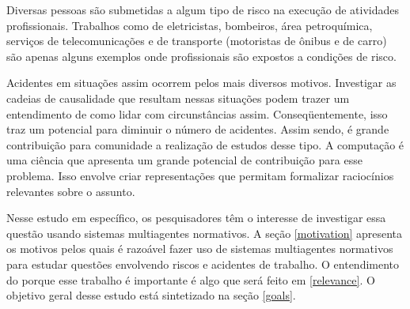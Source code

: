 Diversas pessoas são submetidas a algum tipo de risco na execução de atividades profissionais. Trabalhos como de eletricistas, bombeiros, área petroquímica, serviços de telecomunicações e de transporte (motoristas de ônibus e de carro) são apenas alguns exemplos onde profissionais são expostos a condições de risco.

Acidentes em situações assim ocorrem pelos mais diversos motivos. Investigar as cadeias de causalidade que resultam nessas situações podem trazer um entendimento de como lidar com circunstâncias assim. Conseqüentemente, isso traz um potencial para diminuir o número de acidentes. Assim sendo, é grande contribuição para comunidade a realização de estudos desse tipo. A computação é uma ciência que apresenta um grande potencial de contribuição para esse problema. Isso envolve criar representações que permitam formalizar raciocínios relevantes sobre o assunto.

Nesse estudo em específico, os pesquisadores têm o interesse de investigar essa questão usando sistemas multiagentes normativos. A seção \ref{motivation} apresenta os motivos pelos quais é razoável fazer uso de sistemas multiagentes normativos para estudar questões envolvendo riscos e acidentes de trabalho. O entendimento do porque esse trabalho é importante é algo que será feito em \ref{relevance}. O objetivo geral desse estudo está sintetizado na seção \ref{goals}.